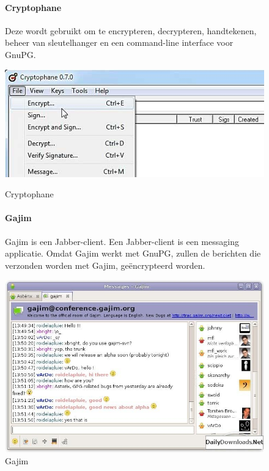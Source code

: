 \documentclass[12pt]{article}
\begin{document}
			
				\begin{figure}[!ht]
					\paragraph{Cryptophane}
						Deze wordt gebruikt om te encrypteren, decrypteren, handtekenen, beheer van sleutelhanger en een command-line interface voor GnuPG.\\
					\begin{center}
						\includegraphics[scale=0.6]{Pictures/cryptophane}
					\end{center}
					\caption{Cryptophane}
				
					\paragraph{Gajim}
						Gajim is een Jabber-client. Een Jabber-client is een messaging applicatie.
						Omdat Gajim werkt met GnuPG, zullen de berichten die verzonden worden met Gajim, geëncrypteerd worden.
					\begin{center}
						\includegraphics[scale=0.4]{Pictures/gajim}
					\end{center}
					\caption{Gajim}
				\end{figure}
				
\end{document}
